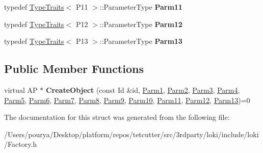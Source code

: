 \begin{DoxyCompactItemize}
\item 
\hypertarget{structLoki_1_1FactoryImpl_3_01AP_00_01Id_00_01LOKI__TYPELIST__13_07P1_00_01P2_00_01P3_00_01P4_00247c15bcbc98870388f2510cb34a203f_ad7235bd1d5fb7aa81d1b6d149ee728e8}{}typedef \hyperlink{classLoki_1_1TypeTraits}{Type\+Traits}$<$ P11 $>$\+::Parameter\+Type {\bfseries Parm11}\label{structLoki_1_1FactoryImpl_3_01AP_00_01Id_00_01LOKI__TYPELIST__13_07P1_00_01P2_00_01P3_00_01P4_00247c15bcbc98870388f2510cb34a203f_ad7235bd1d5fb7aa81d1b6d149ee728e8}

\item 
\hypertarget{structLoki_1_1FactoryImpl_3_01AP_00_01Id_00_01LOKI__TYPELIST__13_07P1_00_01P2_00_01P3_00_01P4_00247c15bcbc98870388f2510cb34a203f_afbadb62b7bb116735a556d4142e73105}{}typedef \hyperlink{classLoki_1_1TypeTraits}{Type\+Traits}$<$ P12 $>$\+::Parameter\+Type {\bfseries Parm12}\label{structLoki_1_1FactoryImpl_3_01AP_00_01Id_00_01LOKI__TYPELIST__13_07P1_00_01P2_00_01P3_00_01P4_00247c15bcbc98870388f2510cb34a203f_afbadb62b7bb116735a556d4142e73105}

\item 
\hypertarget{structLoki_1_1FactoryImpl_3_01AP_00_01Id_00_01LOKI__TYPELIST__13_07P1_00_01P2_00_01P3_00_01P4_00247c15bcbc98870388f2510cb34a203f_a8771198dbdbfc7dc519f838ed0d56fa0}{}typedef \hyperlink{classLoki_1_1TypeTraits}{Type\+Traits}$<$ P13 $>$\+::Parameter\+Type {\bfseries Parm13}\label{structLoki_1_1FactoryImpl_3_01AP_00_01Id_00_01LOKI__TYPELIST__13_07P1_00_01P2_00_01P3_00_01P4_00247c15bcbc98870388f2510cb34a203f_a8771198dbdbfc7dc519f838ed0d56fa0}

\end{DoxyCompactItemize}
\subsection*{Public Member Functions}
\begin{DoxyCompactItemize}
\item 
\hypertarget{structLoki_1_1FactoryImpl_3_01AP_00_01Id_00_01LOKI__TYPELIST__13_07P1_00_01P2_00_01P3_00_01P4_00247c15bcbc98870388f2510cb34a203f_a96b4bdd9055f0b355ff9f772ef6d8a2d}{}virtual A\+P $\ast$ {\bfseries Create\+Object} (const Id \&id, \hyperlink{classLoki_1_1EmptyType}{Parm1}, \hyperlink{classLoki_1_1EmptyType}{Parm2}, \hyperlink{classLoki_1_1EmptyType}{Parm3}, \hyperlink{classLoki_1_1EmptyType}{Parm4}, \hyperlink{classLoki_1_1EmptyType}{Parm5}, \hyperlink{classLoki_1_1EmptyType}{Parm6}, \hyperlink{classLoki_1_1EmptyType}{Parm7}, \hyperlink{classLoki_1_1EmptyType}{Parm8}, \hyperlink{classLoki_1_1EmptyType}{Parm9}, \hyperlink{classLoki_1_1EmptyType}{Parm10}, \hyperlink{classLoki_1_1EmptyType}{Parm11}, \hyperlink{classLoki_1_1EmptyType}{Parm12}, \hyperlink{classLoki_1_1EmptyType}{Parm13})=0\label{structLoki_1_1FactoryImpl_3_01AP_00_01Id_00_01LOKI__TYPELIST__13_07P1_00_01P2_00_01P3_00_01P4_00247c15bcbc98870388f2510cb34a203f_a96b4bdd9055f0b355ff9f772ef6d8a2d}

\end{DoxyCompactItemize}


The documentation for this struct was generated from the following file\+:\begin{DoxyCompactItemize}
\item 
/\+Users/pourya/\+Desktop/platform/repos/tetcutter/src/3rdparty/loki/include/loki/Factory.\+h\end{DoxyCompactItemize}
